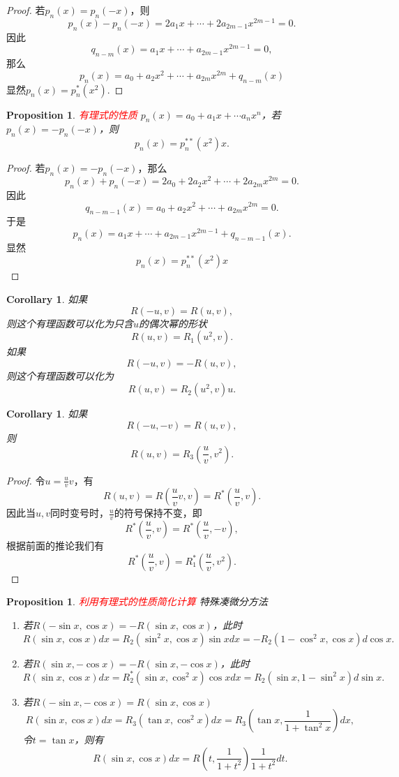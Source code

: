 \documentclass{article}
\newtheorem{corollary}[theorem]{Corollary}
\newtheorem{proposition}[theorem]{Proposition}
\newcommand{\redt}[1]{\textcolor{red}{#1}}
\begin{document}
\begin{proof}
若$p_n(x) = p_n(-x)$，则
$$
p_n(x) - p_n(-x) = 2a_1x + \cdots + 2a_{2m-1}x^{2m-1} = 0.
$$
因此
$$
q_{n-m}(x) = a_1x + \cdots + a_{2m-1}x^{2m-1} = 0,
$$
那么
$$
p_n(x) = a_0 + a_2x^{2} + \cdots + a_{2m}x^{2m}  + q_{n-m}(x)
$$
显然$p_n(x) = p_n^*(x^2)$. 
\end{proof}

\begin{proposition}
\rm  \redt{有理式的性质} $p_n(x)=a_0 + a_1x + \cdots a_{n}x^n$，若$p_n(x) = -p_n(-x)$，则
$$
p_n(x) = p_n^{**}(x^2)x.
$$
\end{proposition}

\begin{proof}
若$p_n(x) = -p_n(-x)$，那么
$$
p_n(x) + p_n(-x) = 2a_0 + 2a_2x^{2} +\cdots + 2a_{2m}x^{2m} = 0.
$$
因此
$$
q_{n-m-1}(x) = a_0 + a_2x^2 + \cdots +a_{2m}x^{2m}=0.
$$
于是
$$
p_n(x) = a_1x + \cdots + a_{2m-1}x^{2m-1} + q_{n-m-1}(x).  
$$
显然
$$
p_n(x) = p_n^{**}(x^2)x
$$
\end{proof}

\begin{corollary}
\rm 如果
$$
R(-u,v) = R(u,v),
$$
则这个有理函数可以化为只含$u$的偶次幂的形状
$$
R(u,v) = R_1(u^2,v).
$$
如果
$$
R(-u,v) = -R(u,v),
$$
则这个有理函数可以化为
$$
R(u,v) = R_2(u^2,v)u.
$$
\end{corollary}

\begin{corollary}
\rm 如果
$$
R(-u,-v) = R(u,v),
$$
则
$$
R(u,v) = R_3(\frac{u}{v},v^2).
$$
\end{corollary}

\begin{proof}
令$u = \frac{u}{v}v$，有
$$
R(u,v) = R(\frac{u}{v}v,v) = R^*(\frac{u}{v},v).
$$
因此当$u,v$同时变号时，$\frac{u}{v}$的符号保持不变，即
$$
R^*(\frac{u}{v},v) = R^*(\frac{u}{v},-v),
$$
根据前面的推论我们有
$$
R^*(\frac{u}{v},v) = R_1^*(\frac{u}{v},v^2).  
$$
\end{proof}

\begin{proposition}
\rm \redt{利用有理式的性质简化计算} 特殊凑微分方法
\begin{enumerate}
	\item 若$R(-\sin x,\cos x) = - R(\sin x, \cos x)$，此时
	$$
	R(\sin x,\cos x)dx = R_2(\sin^2 x, \cos x)\sin x dx = -R_2(1-\cos^2x,\cos x)d\cos x.
	$$
	\item 若$R(\sin x,-\cos x) = - R(\sin x, -\cos x)$，此时
	$$
	R(\sin x,\cos x)dx = R_2^*(\sin x, \cos^2x )\cos x dx = R_2(\sin x , 1-\sin^2 x)d\sin x.
	$$
	\item 若$R(-\sin x, -\cos x) = R(\sin x ,\cos x)$ 
	$$
	R(\sin x, \cos x)dx = R_3(\tan x,\cos^2 x)dx = R_3(\tan x, \frac{1}{1+\tan^2 x})dx,
	$$
	令$t = \tan x$，则有
	$$
	R(\sin x, \cos x)dx = R\left(t,\frac{1}{1+t^2}\right)\frac{1}{1+t^2}dt. 
	$$
\end{enumerate}
\end{proposition}
\end{document}
